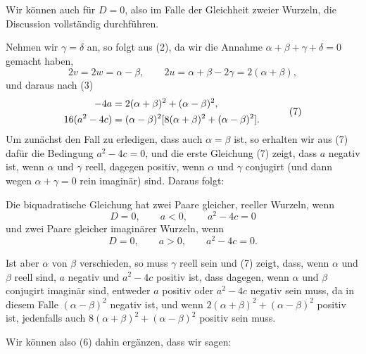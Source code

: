 \documentclass[11pt]{article}
\begin{document}
Wir k\"onnen auch f\"ur $D=0$, also im Falle der Gleichheit zweier Wurzeln, die Discussion vollst\"andig durchf\"uhren.

Nehmen wir $\gamma=\delta$ an, so folgt aus (2), da wir die Annahme $\alpha+\beta+\gamma+\delta=0$ gemacht haben,
\[
        2v=2w=\alpha-\beta,
        \qquad
        2u=\alpha+\beta-2\gamma=2(\alpha+\beta),
\]
und daraus nach (3)
\begin{equation}
\begin{aligned}
        -4a&=2(\alpha+\beta)^2+(\alpha-\beta)^2,\cr
        16(a^2-4c)&=(\alpha-\beta)^2[8(\alpha+\beta)^2+(\alpha-\beta)^2].
\end{aligned}
\tag{7}
\end{equation}
Um zun\"achst den Fall zu erledigen, dass auch $\alpha=\beta$ ist, so erhalten wir aus (7) daf\"ur die Bedingung $a^2-4c=0$, und die erste Gleichung (7) zeigt, dass $a$ negativ ist, wenn $\alpha$ und $\gamma$ reell, dagegen positiv, wenn $\alpha$ und $\gamma$ conjugirt (und dann wegen $\alpha+\gamma=0$ rein imagin\"ar) sind. Daraus folgt:

Die biquadratische Gleichung hat zwei Paare gleicher, reeller Wurzeln, wenn
\begin{equation}
        D=0,
        \qquad a<0,
        \qquad a^2-4c=0
\tag{8}
\end{equation}
und zwei Paare gleicher imagin\"arer Wurzeln, wenn
\begin{equation}
        D=0,
        \qquad a>0,
        \qquad a^2-4c=0.
\tag{9}
\end{equation}

Ist aber $\alpha$ von $\beta$ verschieden, so muss $\gamma$ reell sein und (7) zeigt, dass, wenn $\alpha$ und $\beta$ reell sind, $a$ negativ und $a^2-4c$ positiv ist, dass dagegen, wenn $\alpha$ und $\beta$ conjugirt imagin\"ar sind, entweder $a$ positiv oder $a^2-4c$ negativ sein muss, da in diesem Falle $(\alpha-\beta)^2$ negativ ist, und wenn $2(\alpha+\beta)^2+(\alpha-\beta)^2$ positiv ist, jedenfalls auch $8(\alpha+\beta)^2+(\alpha-\beta)^2$ positiv sein muss.

Wir k\"onnen also (6) dahin erg\"anzen, dass wir sagen:
\end{document}

